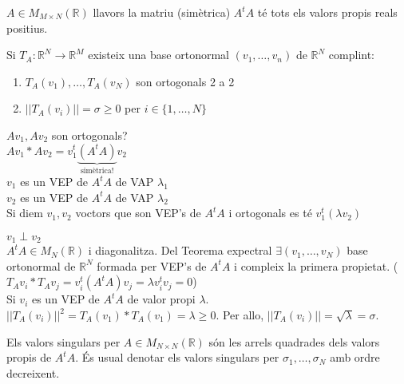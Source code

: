 \documentclass[../main.tex]{subfiles}
\begin{document}
    \begin{fet}
        $A \in M_{M\times N}(\mathbb{R})$ llavors la matriu (simètrica) $A^tA$ té tots els valors propis reals positius.
    \end{fet}
    \begin{teorema}
        Si $T_A: \mathbb{R}^N \rightarrow \mathbb{R}^M$ existeix una base ortonormal $(v_1, \dots, v_n)$ de $\mathbb{R}^N$ complint:
        \begin{enumerate}
            \item $T_A(v_1), \dots, T_A(v_N)$ son ortogonals 2 a 2
            \item $||T_A(v_i)|| = \sigma \geq 0$ per $i \in \{1, \dots, N\}$
        \end{enumerate}
    \end{teorema}
    \begin{idea}
        $Av_1, Av_2$ son ortogonals?\\
        $Av_1*Av_2 = v_1^t \underbrace{(A^tA)}_\text{simètrica!} v_2$\\
        $v_1$ es un VEP de $A^tA$ de VAP $\lambda_1$\\
        $v_2$ es un VEP de $A^tA$ de VAP $\lambda_2$\\
        Si diem $v_1, v_2$ voctors que son VEP's de $A^tA$ i ortogonals es té $v_1^t(\lambda v_2)$
    \end{idea}
    \begin{demostracio}
        $v_1 \perp v_2$\\
        $A^tA \in M_{N}(\mathbb{R})$ i diagonalitza. Del Teorema expectral $\exists (v_1, \dots, v_N)$ base ortonormal de $\mathbb{R}^N$ formada per VEP's de $A^tA$ i compleix la primera propietat. ($T_A v_i * T_A v_j = v_i^t(A^tA) v_j = \lambda v_i^t v_j = 0$)\\
        Si $v_i$ es un VEP de $A^tA$ de valor propi $\lambda$. $||T_A(v_i)||^2 = T_A(v_1) * T_A(v_1) = \lambda \geq 0$. Per allo, $||T_A(v_i)|| = \sqrt{\lambda} = \sigma$.
    \end{demostracio}
    \begin{definicio}
        Els valors singulars per $A \in M_{N \times N}(\mathbb{R})$ són les arrels quadrades dels valors propis de $A^t A$. És usual denotar els valors singulars per $\sigma_1, \dots, \sigma_N$ amb ordre decreixent.
    \end{definicio}
\end{document}
